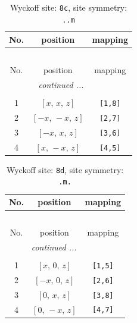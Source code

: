 \documentclass[fleqn,8pt]{jsarticle}
\begin{document}
\begin{longtable}{ccc}
\caption{Wyckoff site: {\tt 8c}, site symmetry: {\tt ..m}}
 \\
 \hline \hline
No. & position & mapping \\ \hline \endfirsthead

\multicolumn{2}{l}{\tablename\ \thetable{}} \\
 \hline \hline
No. & position & mapping \\ \hline \endhead

 \hline \hline
\multicolumn{2}{r}{\footnotesize\it continued ...} \\ \endfoot

 \hline \hline
\multicolumn{2}{r}{} \\ \endlastfoot

1 & $\left[ x,\, x,\, z \right]$ & {\tt [1,8]} \\ \hline
2 & $\left[ - x,\, - x,\, z \right]$ & {\tt [2,7]} \\ \hline
3 & $\left[ - x,\, x,\, z \right]$ & {\tt [3,6]} \\ \hline
4 & $\left[ x,\, - x,\, z \right]$ & {\tt [4,5]} \\
\end{longtable}
\renewcommand{\arraystretch}{1.2}
\begin{longtable}{ccc}
\caption{Wyckoff site: {\tt 8d}, site symmetry: {\tt .m.}}
 \\
 \hline \hline
No. & position & mapping \\ \hline \endfirsthead

\multicolumn{2}{l}{\tablename\ \thetable{}} \\
 \hline \hline
No. & position & mapping \\ \hline \endhead

 \hline \hline
\multicolumn{2}{r}{\footnotesize\it continued ...} \\ \endfoot

 \hline \hline
\multicolumn{2}{r}{} \\ \endlastfoot

1 & $\left[ x,\, 0,\, z \right]$ & {\tt [1,5]} \\ \hline
2 & $\left[ - x,\, 0,\, z \right]$ & {\tt [2,6]} \\ \hline
3 & $\left[ 0,\, x,\, z \right]$ & {\tt [3,8]} \\ \hline
4 & $\left[ 0,\, - x,\, z \right]$ & {\tt [4,7]} \\
\end{longtable}
\renewcommand{\arraystretch}{1.2}
\end{document}
